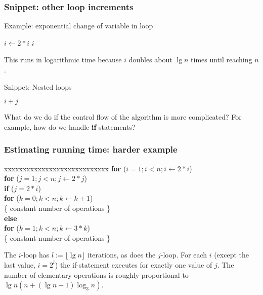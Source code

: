 \begin{Example}
\frametitle{Snippet: other loop increments}
\begin{algorithm}[H]
  \caption{Example: exponential change of variable in loop
    \label{alg:runtime1}}
\begin{algorithmic}[0]
\State {}
\State $i \gets 2*i$
\State {} $i$
\EndWhile
\end{algorithmic}
\end{algorithm}

This runs in logarithmic time because $i$ doubles about $\lg n$ times until reaching $n$.
\end{Example}

\begin{Example}
\begin{algorithm}[H]
  \caption{Snippet: Nested loops
    \label{alg:nestloop}}
\begin{algorithmic}[0]
\State {} $i+j$
\EndFor
\EndFor
\end{algorithmic}
\end{algorithm}
\end{Example}

What do we do if the control flow of the algorithm is more complicated? For example, how do we handle \textbf{if} statements?

\begin{frame}
\frametitle{Estimating running time: harder example}
\begin{tabbing}
xxxx\=xxxx\=xxxx\=xxxx\=xxxx\=xxxx\=xxxx\= \kill
\textbf{for} ($i = 1; i < n; i\gets 2*i$) \\
\> \textbf{for} ($j = 1; j < n; j \gets 2*j$) \\
\> \> \textbf{if} ($j = 2*i$) \\
\> \> \> \textbf{for} ($k = 0; k < n; k\gets k+1$) \\
\> \> \> \> \{ constant number of operations \} \\
\> \> \textbf{else} \\
\> \> \> \textbf{for} ($k = 1; k < n; k\gets 3*k$) \\
\> \> \> \> \{ constant number of operations \}
\end{tabbing}
\pause
The $i$-loop has $l:=\lfloor \lg n \rfloor$ iterations, as does the $j$-loop. 
For each $i$ (except the last value, $i = 2^l$) the if-statement executes for 
exactly one value of $j$. The number of elementary operations is roughly 
proportional to $\lg n (n + (\lg n - 1)\log_3 n)$. 
\end{frame}



